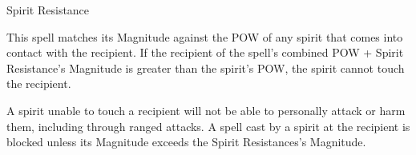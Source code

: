 %
%
%
%


\begin{rpg-spell}
{Spirit Resistance}
{}

This spell matches its Magnitude against the POW of any spirit that comes into contact with the recipient. If the recipient of the spell’s combined POW + Spirit Resistance’s Magnitude is greater than the spirit’s POW, the spirit cannot touch the recipient. 

A spirit unable to touch a recipient will not be able to personally attack or harm them, including through ranged attacks. A spell cast by a spirit at the recipient is blocked unless its Magnitude exceeds the Spirit Resistances’s Magnitude. 
\end{rpg-spell}


